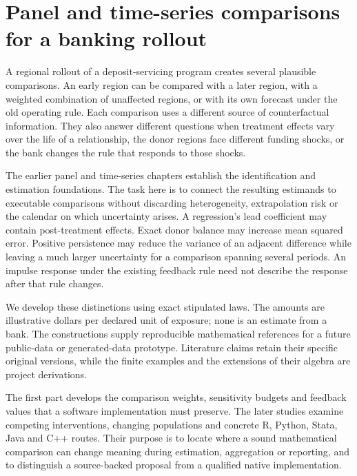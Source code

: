 \chapter{Panel and time-series comparisons for a banking rollout}
\label{exec17:s6}

A regional rollout of a deposit-servicing program creates several plausible
comparisons. An early region can be compared with a later region, with a
weighted combination of unaffected regions, or with its own forecast under the
old operating rule. Each comparison uses a different source of counterfactual
information. They also answer different questions when treatment effects
vary over the life of a relationship, the donor regions face different funding
shocks, or the bank changes the rule that responds to those shocks.

The earlier panel and time-series chapters establish the identification and
estimation foundations. The task here is to connect the resulting estimands
to executable comparisons without discarding heterogeneity, extrapolation risk
or the calendar on which uncertainty arises. A regression's lead coefficient
may contain post-treatment effects. Exact donor balance may increase mean
squared error. Positive persistence may reduce the variance of an adjacent
difference while leaving a much larger uncertainty for a comparison spanning
several periods. An impulse response under the existing feedback rule need
not describe the response after that rule changes.

We develop these distinctions using exact stipulated laws. The amounts are
illustrative dollars per declared unit of exposure; none is an estimate from
a bank. The constructions supply reproducible mathematical references for a
future public-data or generated-data prototype. Literature claims retain their
specific original versions, while the finite examples and the extensions of
their algebra are project derivations.~\citep{exec17_s6_math}

The first part develops the comparison weights, sensitivity budgets and
feedback values that a software implementation must preserve. The later
studies examine competing interventions, changing populations and concrete
R, Python, Stata, Java and C++ routes. Their purpose is to locate where a
sound mathematical comparison can change meaning during estimation,
aggregation or reporting, and to distinguish a source-backed proposal
from a qualified native implementation.

